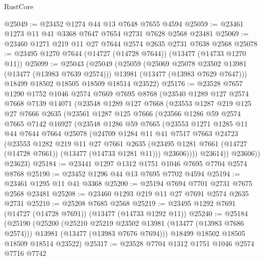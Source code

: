 \begin{lexlean}{RustCore}
\begin{coremodule}
@25049 := @23452 @1274 @44 @13 @7648 @7655 @4594
@25059 := @23461 @1273 @11 @41 @3368 @7647 @7654 @2731 @7628 @2568 @23481
@25069 := @23460 @1271 @219 @11 @27 @7644 @2574 @2635 @2731 @7638 @2568
@25078 := @23495 @1270 @7644 (@14727 (@14728 @7644)) (@13477 (@14733 @1270 @11))
@25099 := @25043
    (@25049
      (@25059
        (@25069 @25078 @23502 @13981 (@13477 (@13983 @7639 @2574)))
        @13981
        (@13477 (@13983 @7629 @7647)))
      @18499
      @18502
      @18505
      @18509
      @18514
      @23522)
@25176 := @23528
    @7657
    @1290
    @1752
    @1046
    @2574
    @7669
    @7695
    @8768
    (@23540
      @1289
      @127
      @2574
      @7668
      @7139
      @14071
      (@23548
        @1289
        @127
        @7668
        (@23553
          @1287
          @219
          @125
          @27
          @7666
          @2635
          (@23561
            @1287
            @125
            @7666
            (@23566
              @1286
              @59
              @2574
              @7665
              @7142
              @16927
              (@23548
                @1286
                @59
                @7665
                (@23553
                  @1271
                  @1285
                  @11
                  @44
                  @7644
                  @7664
                  @25078
                  (@24709
                    @1284
                    @11
                    @41
                    @7517
                    @7663
                    @24723
                    (@23553
                      @1282
                      @219
                      @11
                      @27
                      @7661
                      @2635
                      (@23495 @1281 @7661 (@14727 (@14728 @7661)) (@13477 (@14733 @1281 @11)))
                      @23606))))
              @23614))
          @23606))
      @23623)
@25184 := @23441 @1297 @1312 @1751 @1046 @7695 @7704 @2574 @8768
@25190 := @23452 @1296 @44 @13 @7695 @7702 @4594
@25194 := @23461 @1295 @11 @41 @3368
@25200 := @25194 @7694 @7701 @2731 @7675 @2568 @23481
@25208 := @23460 @1293 @219 @11 @27 @7691 @2574 @2635 @2731
@25210 := @25208 @7685 @2568
@25219 := @23495 @1292 @7691 (@14727 (@14728 @7691)) (@13477 (@14733 @1292 @11))
@25240 := @25184
    (@25190
      (@25200
        (@25210 @25219 @23502 @13981 (@13477 (@13983 @7686 @2574)))
        @13981
        (@13477 (@13983 @7676 @7694)))
      @18499
      @18502
      @18505
      @18509
      @18514
      @23522)
@25317 := @23528
    @7704
    @1312
    @1751
    @1046
    @2574
    @7716
    @7742

\end{coremodule}
\end{lexlean}
